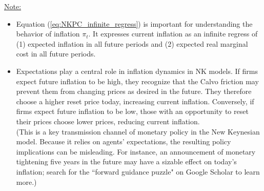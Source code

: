 \documentclass[12pt]{article}
\begin{document}
\underline{Note:} 
\begin{itemize}
		\item Equation (\ref{eq:NKPC_infinite_regress}) is important for understanding the behavior of inflation $\pi_t$. It expresses current inflation as an infinite regress of (1) expected inflation in all future periods and (2) expected real marginal cost in all future periods. 
		\item Expectations play a central role in inflation dynamics in NK models. If firms expect future inflation to be high, they recognize that the Calvo friction may prevent them from changing prices as desired in the future. They therefore choose a higher reset price today, increasing current inflation. Conversely, if firms expect future inflation to be low, those with an opportunity to reset their prices choose lower prices, reducing current inflation. \\
		(This is a key transmission channel of monetary policy in the New Keynesian model. Because it relies on agents' expectations, the resulting policy implications can be misleading. For instance, an announcement of monetary tightening five years in the future may have a sizable effect on today's inflation; search for the ``forward guidance puzzle" on Google Scholar to learn more.)
\end{itemize}
\end{document}

